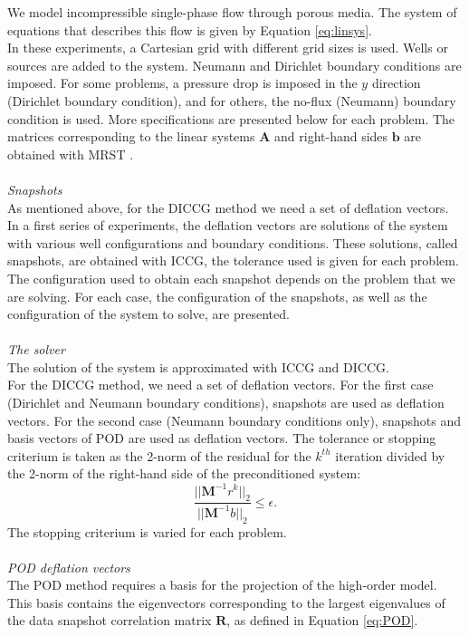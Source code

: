 \documentclass{ecmorXV}
\begin{document}
We model incompressible single-phase flow through porous media. The system of equations that describes 
this flow is given by Equation \eqref{eq:linsys}.\\
In these experiments, a Cartesian grid with different grid sizes is used. Wells or sources are added to the system. 
Neumann and Dirichlet boundary conditions are imposed. For some problems, a pressure drop is 
imposed in the $y$ direction (Dirichlet boundary condition), and for others, the no-flux (Neumann) boundary condition 
is used.
More specifications are presented below for each problem. 
The matrices corresponding to the linear systems $\mathbf{A}$ and right-hand sides $\mathbf{b}$ are obtained with MRST \cite{Lie13}.
\\ \\
\emph{Snapshots}\\
As mentioned above, for the DICCG method we need a set of deflation vectors. In a first series of
experiments, the deflation vectors are 
solutions of the system with various well configurations and boundary conditions. These solutions, 
called snapshots, are obtained with ICCG, the tolerance used is given for each problem. 
The configuration used to obtain each snapshot depends on the problem that we are solving. For each case,
the configuration of the snapshots, as well as the configuration of the system to solve, are presented.
\\ \\
\emph{The solver}\\
The solution of the system is approximated with ICCG and DICCG.\\
For the DICCG method, we need a set of deflation vectors. For the first case (Dirichlet and Neumann boundary conditions),
snapshots are used as deflation vectors. For the second case (Neumann boundary conditions only),
snapshots and basis vectors of POD are used as deflation vectors.
The tolerance or stopping criterium is taken as the 2-norm of the residual for the $k^{th}$ iteration divided by 
the 2-norm of the right-hand side of the preconditioned system: 
$$\frac{||\mathbf{M}^{-1}r^k||_2}{||\mathbf{M}^{-1}b||_2}\leq \epsilon.$$
The stopping criterium is varied for each problem. 
\\ \\
\emph{POD deflation vectors}\\
The POD method requires a basis for the projection of the high-order model. 
This basis contains the eigenvectors corresponding to the largest eigenvalues of the
data snapshot correlation matrix $\mathbf{R}$, as defined in Equation \eqref{eq:POD}.\\
\end{document}
